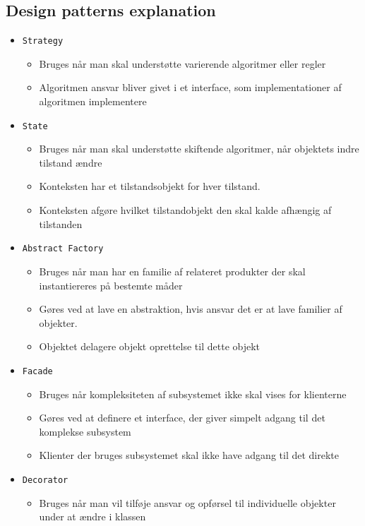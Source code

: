 \documentclass[a4, english]{article}
\begin{document}
\subsection{Design patterns explanation}
\begin{itemize}
	\item \texttt{Strategy}
  \begin{itemize}
  	\item Bruges når man skal understøtte varierende algoritmer eller regler
    \item Algoritmen ansvar bliver givet i et interface, som implementationer af algoritmen implementere
  \end{itemize}
  \item \texttt{State}
  \begin{itemize}
  	\item Bruges når man skal understøtte skiftende algoritmer, når objektets indre tilstand ændre
    \item Konteksten har et tilstandsobjekt for hver tilstand.
    \item Konteksten afgøre hvilket tilstandobjekt den skal kalde afhængig af tilstanden 
  \end{itemize}
  \item \texttt{Abstract Factory}  
  \begin{itemize}
  	\item Bruges når man har en familie af relateret produkter der skal instantiereres på bestemte måder
    \item Gøres ved at lave en abstraktion, hvis ansvar det er at lave familier af objekter.
    \item Objektet delagere objekt oprettelse til dette objekt 
  \end{itemize}
  \item \texttt{Facade}
  \begin{itemize}
	  \item Bruges når kompleksiteten af subsystemet ikke skal vises for klienterne
    \item Gøres ved at definere et interface, der giver simpelt adgang til det komplekse subsystem 
    \item Klienter der bruges subsystemet skal ikke have adgang til det direkte 
  \end{itemize}
  \item \texttt{Decorator}
  \begin{itemize}
  	\item Bruges når man vil tilføje ansvar og opførsel til individuelle objekter under at ændre i klassen

\end{itemize}
\end{itemize}
\end{document}
